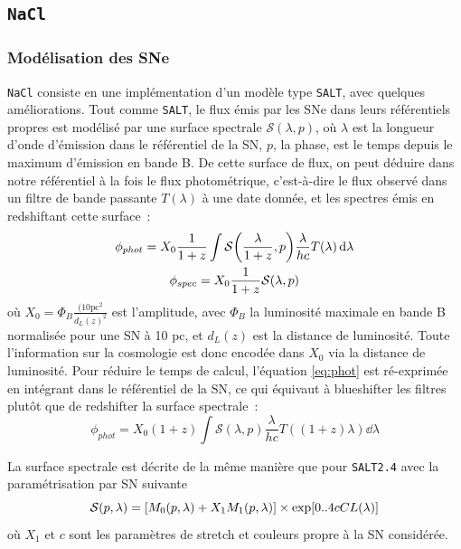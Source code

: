 \documentclass{book}
\def\nacl{\texttt{NaCl}\xspace}
\def\saltd{\texttt{SALT2.4}\xspace}
\let\mcl\mathcal
\begin{document}
\subsection{\nacl}
\label{anx:nacl}

\subsubsection{Modélisation des SNe}

\nacl consiste en une implémentation d'un modèle type \texttt{SALT}, avec quelques améliorations. Tout comme \texttt{SALT}, le flux émis par les SNe dans leurs référentiels propres est modélisé par une surface spectrale $\mcl S(\lambda, p)$, où $\lambda$ est la longueur d'onde d'émission dans le référentiel de la SN, $p$, la phase, est le temps depuis le maximum d'émission en bande B.
De cette surface de flux, on peut déduire dans notre référentiel à la fois le flux photométrique, c'est-à-dire le flux observé dans un filtre de bande passante $T(\lambda)$ à une date donnée, et les spectres émis en redshiftant cette surface~:
\begin{gather}
	\phi_{phot} = X_0 \frac{1}{1+z} \int \mcl S\qty(\frac{\lambda}{1+z}, p) \frac{\lambda}{hc} T(\lambda) \dd{\lambda} \label{eq:phot}\\
	\phi_{spec}  = X_0 \frac{1}{1+z} \mcl S(\lambda, p) \label{eq:spec}
\end{gather}
où $X_0 = \Phi_B \frac{(10\text{pc}^2}{d_L(z)^2}$ est l'amplitude, avec $\Phi_B$ la luminosité maximale en bande B normalisée pour une SN à 10 pc, et $d_L(z)$ est la distance de luminosité. Toute l'information sur la cosmologie est donc encodée dans $X_0$ via la distance de luminosité.
Pour réduire le temps de calcul, l'équation \ref{eq:phot} est ré-exprimée en intégrant dans le référentiel de la SN, ce qui équivaut à blueshifter les filtres plutôt que de redshifter la surface spectrale~:
\begin{equation}
	\phi_{phot} = X_0 (1+z) \int \mcl S(\lambda, p) \frac{\lambda}{hc} T((1+z)\lambda) \dd{\lambda}
\end{equation}

La surface spectrale est décrite de la même manière que pour \saltd avec la paramétrisation par SN suivante
\begin{equation}
    \mcl S (p, \lambda) = \qty[M_0(p, \lambda) + X_1 M_1(p, \lambda)] \times \exp[0..4 c CL(\lambda)]
\end{equation}
où $X_1$ et $c$ sont les paramètres de stretch et couleurs propre à la SN considérée.
\end{document}
